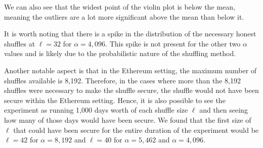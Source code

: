 We can also see that the widest point of the violin plot is below the mean, meaning the outliers are a lot more significant above the mean than below it.

It is worth noting that there is a spike in the distribution of the necessary honest shuffles at $\ell=32$ for $\alpha=4,096$.
This spike is not present for the other two $\alpha$ values and is likely due to the probabilistic nature of the shuffling method.

Another notable aspect is that in the Ethereum setting, the maximum number of shuffles available is 8,192.
Therefore, in the cases where more than the 8,192 shuffles were necessary to make the shuffle secure, the shuffle would not have been secure within the Ethereum setting.
Hence, it is also possible to see the experiment as running 1,000 days worth of each shuffle size $\ell$ and then seeing how many of those days would have been secure.
We found that the first size of $\ell$ that could have been secure for the entire duration of the experiment would be $\ell=42$ for $\alpha=8,192$ and $\ell=40$ for $\alpha=5,462$ and $\alpha=4,096$.


